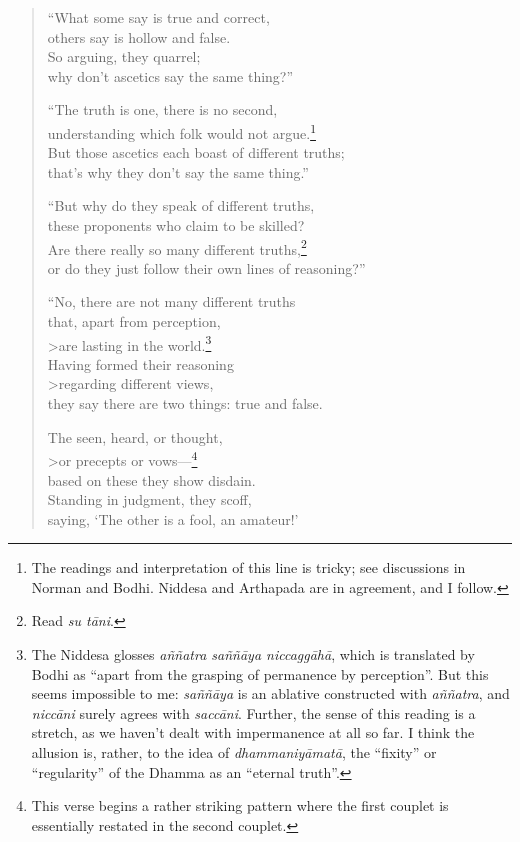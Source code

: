 \documentclass[12pt,openany]{book}%
\begin{document}
\begin{verse}
“What some say is true and correct, \\
others say is hollow and false. \\
So arguing, they quarrel; \\
why don’t ascetics say the same thing?” 

“The truth is one, there is no second, \\
understanding which folk would not argue.\footnote{The readings and interpretation of this line is tricky; see discussions in Norman and Bodhi. Niddesa and Arthapada are in agreement, and I follow. } \\
But those ascetics each boast of different truths; \\
that’s why they don’t say the same thing.” 

“But why do they speak of different truths, \\
these proponents who claim to be skilled? \\
Are there really so many different truths,\footnote{Read \textit{su \textsanskrit{tāni}}. } \\
or do they just follow their own lines of reasoning?” 

“No, there are not many different truths \\
that, apart from perception, \\>are lasting in the world.\footnote{The Niddesa glosses \textit{\textsanskrit{aññatra} \textsanskrit{saññāya} \textsanskrit{niccaggāhā}}, which is translated by Bodhi as “apart from the grasping of permanence by perception”. But this seems impossible to me: \textit{\textsanskrit{saññāya}} is an ablative constructed with \textit{\textsanskrit{aññatra}}, and \textit{\textsanskrit{niccāni}} surely agrees with \textit{\textsanskrit{saccāni}}. Further, the sense of this reading is a stretch, as we haven’t dealt with impermanence at all so far. I think the allusion is, rather, to the idea of \textit{\textsanskrit{dhammaniyāmatā}}, the “ﬁxity” or “regularity” of the Dhamma as an “eternal truth”. } \\
Having formed their reasoning \\>regarding different views, \\
they say there are two things: true and false. 

The seen, heard, or thought, \\>or precepts or vows—\footnote{This verse begins a rather striking pattern where the first couplet is essentially restated in the second couplet. } \\
based on these they show disdain. \\
Standing in judgment, they scoff, \\
saying, ‘The other is a fool, an amateur!’ 


\end{verse}
\end{document}
